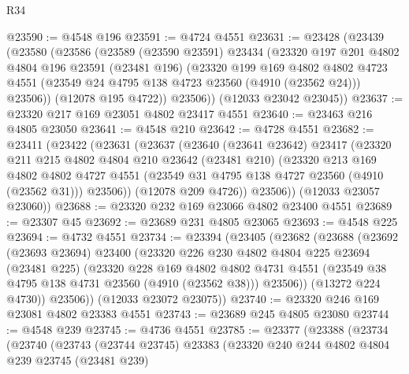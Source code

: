 \begin{lexlean}{R34}
\begin{coremodule}
@23590 := @4548 @196
@23591 := @4724 @4551
@23631 := @23428
    (@23439
      (@23580
        (@23586
          (@23589
            (@23590 @23591)
            @23434
            (@23320
              @197
              @201
              @4802
              @4804
              @196
              @23591
              (@23481 @196)
              (@23320
                @199
                @169
                @4802
                @4802
                @4723
                @4551
                (@23549 @24 @4795 @138 @4723 @23560 (@4910 (@23562 @24)))
                @23506))
            (@12078 @195 @4722))
          @23506))
      (@12033 @23042 @23045))
@23637 := @23320 @217 @169 @23051 @4802 @23417 @4551
@23640 := @23463 @216 @4805 @23050
@23641 := @4548 @210
@23642 := @4728 @4551
@23682 := @23411
    (@23422
      (@23631
        (@23637
          (@23640
            (@23641 @23642)
            @23417
            (@23320
              @211
              @215
              @4802
              @4804
              @210
              @23642
              (@23481 @210)
              (@23320
                @213
                @169
                @4802
                @4802
                @4727
                @4551
                (@23549 @31 @4795 @138 @4727 @23560 (@4910 (@23562 @31)))
                @23506))
            (@12078 @209 @4726))
          @23506))
      (@12033 @23057 @23060))
@23688 := @23320 @232 @169 @23066 @4802 @23400 @4551
@23689 := @23307 @45
@23692 := @23689 @231 @4805 @23065
@23693 := @4548 @225
@23694 := @4732 @4551
@23734 := @23394
    (@23405
      (@23682
        (@23688
          (@23692
            (@23693 @23694)
            @23400
            (@23320
              @226
              @230
              @4802
              @4804
              @225
              @23694
              (@23481 @225)
              (@23320
                @228
                @169
                @4802
                @4802
                @4731
                @4551
                (@23549 @38 @4795 @138 @4731 @23560 (@4910 (@23562 @38)))
                @23506))
            (@13272 @224 @4730))
          @23506))
      (@12033 @23072 @23075))
@23740 := @23320 @246 @169 @23081 @4802 @23383 @4551
@23743 := @23689 @245 @4805 @23080
@23744 := @4548 @239
@23745 := @4736 @4551
@23785 := @23377
    (@23388
      (@23734
        (@23740
          (@23743
            (@23744 @23745)
            @23383
            (@23320
              @240
              @244
              @4802
              @4804
              @239
              @23745
              (@23481 @239)

\end{coremodule}
\end{lexlean}
